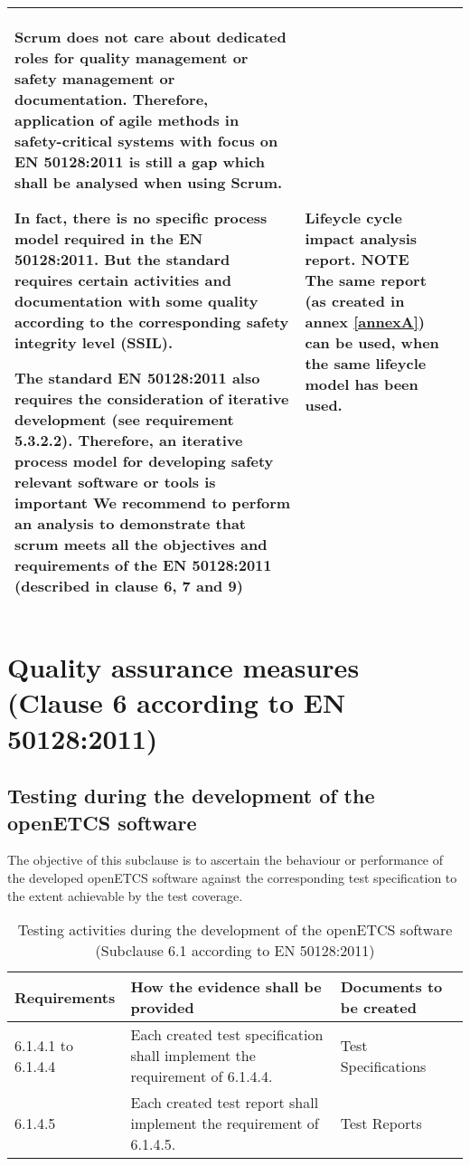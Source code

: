 \documentclass{template/openetcs_report}
\begin{document}
{\begin{longtable}{|p{2cm}|p{9cm}|p{3cm}|}
Scrum does not care about dedicated roles for quality management or safety management or documentation. Therefore, application of agile methods in safety-critical systems with focus on EN 50128:2011 is still a gap which shall be analysed when using Scrum.

In fact, there is no specific process model required in the EN 50128:2011. But the standard requires certain activities and documentation with some quality according to the corresponding safety integrity level (SSIL). 

The standard EN 50128:2011 also requires the consideration of iterative development (see requirement 5.3.2.2). Therefore, an iterative process model for developing safety relevant software or tools is important
We recommend to perform an analysis to demonstrate that scrum meets all the objectives and requirements of the EN 50128:2011 (described in clause 6, 7 and 9)
& Lifeycle cycle impact analysis report.
\linebreak
\linebreak
NOTE\linebreak
The same report (as created in annex \ref{annexA}) can be used, when the same lifeycle model has been used.\\ 
\hline
\end{longtable}}



\section{Quality assurance measures (Clause 6 according to EN 50128:2011)}
\label{clause62}
\subsection{Testing during the development of the openETCS software}
\begin{flushleft}
The objective of this subclause is to ascertain the behaviour or performance of the developed openETCS software against the corresponding test specification to the extent achievable by the test coverage.
\end{flushleft}
{\footnotesize\sffamily\centering
\begin{longtable}{|p{2cm}|p{9cm}|p{3cm}|}
\caption{Testing activities during the development of the openETCS software (Subclause 6.1 according to EN 50128:2011)}\\
\hline
\bfseries Requirements & \bfseries How the evidence shall be provided & \bfseries Documents to be created\\
\hline
\hline
\endhead
\hline
\endfoot

6.1.4.1 to 6.1.4.4 & Each created test specification shall implement the requirement of 6.1.4.4.
& Test Specifications \\ 
\hline
6.1.4.5 & Each created test report shall implement the requirement of 6.1.4.5.
& Test Reports \\ 
\hline
\end{longtable}}
\end{document}

